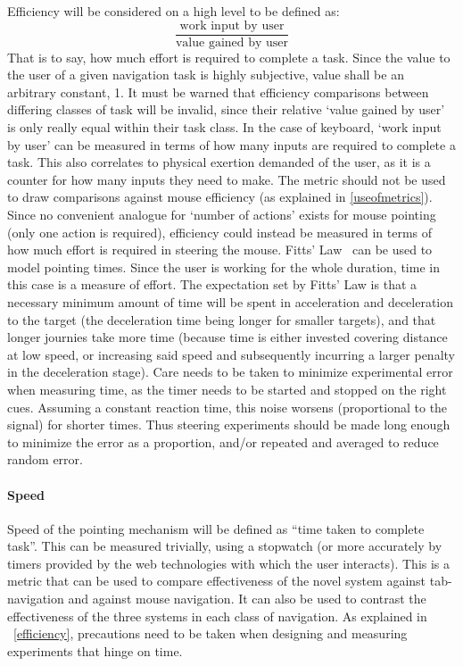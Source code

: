 \documentclass[a4paper, 11pt]{article}
\begin{document}
Efficiency will be considered on a high level to be defined as:\[
 \frac{\text{work input by user}}{\text{value gained by user}}
\] That is to say, how much effort is required to complete a task. Since the value to the user of a given navigation task is highly subjective, value shall be an arbitrary constant, 1. It must be warned that efficiency comparisons between differing classes of task will be invalid, since their relative `value gained by user' is only really equal within their task class.
In the case of keyboard, `work input by user' can be measured in terms of how many inputs are required to complete a task. This also correlates to physical exertion demanded of the user, as it is a counter for how many inputs they need to make. The metric should not be used to draw comparisons against mouse efficiency (as explained in \cref{useofmetrics}).
Since no convenient analogue for `number of actions' exists for mouse pointing (only one action is required), efficiency could instead be measured in terms of how much effort is required in steering the mouse. Fitts' Law~\cite{fittslaw} can be used to model pointing times. Since the user is working for the whole duration, time in this case is a measure of effort. The expectation set by Fitts' Law is that a necessary minimum amount of time will be spent in acceleration and deceleration to the target (the deceleration time being longer for smaller targets), and that longer journies take more time (because time is either invested covering distance at low speed, or increasing said speed and subsequently incurring a larger penalty in the deceleration stage).
Care needs to be taken to minimize experimental error when measuring time, as the timer needs to be started and stopped on the right cues. Assuming a constant reaction time, this noise worsens (proportional to the signal) for shorter times. Thus steering experiments should be made long enough to minimize the error as a proportion, and/or repeated and averaged to reduce random error.

\paragraph{Speed}
Speed of the pointing mechanism will be defined as ``time taken to complete task''. This can be measured trivially, using a stopwatch (or more accurately by timers provided by the web technologies with which the user interacts). This is a metric that can be used to compare effectiveness of the novel system against tab-navigation and against mouse navigation. It can also be used to contrast the effectiveness of the three systems in each class of navigation. As explained in ~\cref{efficiency}, precautions need to be taken when designing and measuring experiments that hinge on time.
\end{document}
